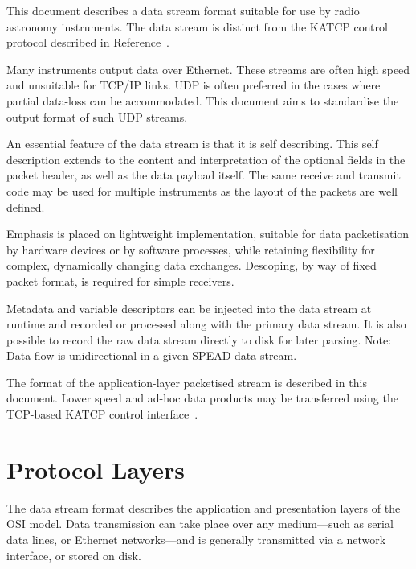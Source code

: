 \documentclass[11pt,english,twoside]{article}
\begin{document}
This document describes a data stream format suitable for use by radio astronomy instruments. The data stream is distinct from the KATCP
control protocol described in Reference~\cite{ffdbectl}.

Many instruments output data over Ethernet. These streams are often high speed and unsuitable for TCP/IP links. UDP is often preferred in the
cases where partial data-loss can be accommodated. This document aims to standardise the output format of such UDP streams.

An essential feature of the data stream is that it is self describing.  This self description extends to the content and interpretation of the
optional fields in the packet header, as well as the data payload itself.  The same receive and transmit code may be used for multiple
instruments as the layout of the packets are well defined.

Emphasis is placed on lightweight implementation, suitable for data packetisation by hardware devices or by software processes, while retaining
flexibility for complex, dynamically changing data exchanges. Descoping, by way of fixed packet format, is required for simple receivers.

Metadata and variable descriptors can be injected into the data stream at runtime and recorded or processed along with the primary data stream. It
is also possible to record the raw data stream directly to disk for later parsing. Note: Data flow is unidirectional in a given SPEAD data
stream.

The format of the application-layer packetised stream is described in this document. Lower speed and ad-hoc data products may be transferred
using the TCP-based KATCP control interface~\cite{ffdbectl}.


\section{Protocol Layers}

The data stream format describes the application and presentation layers of the OSI model. Data transmission can take place over any
medium---such as serial data lines, or Ethernet networks---and is generally transmitted via a network interface, or stored on disk.
\end{document}
